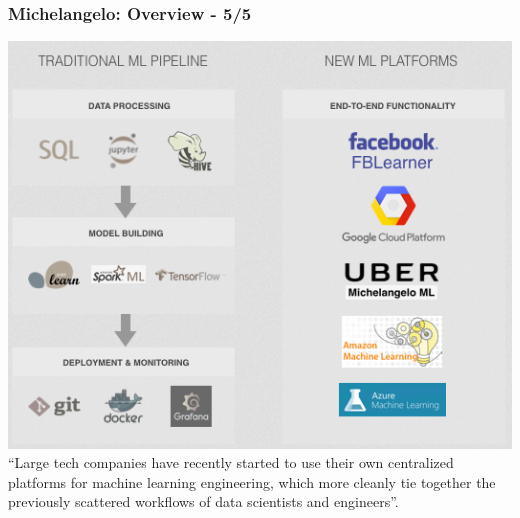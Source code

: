 \documentclass[hyperref={pdfpagelabels=false}]{beamer}
\begin{document}
        \begin{frame}
          \frametitle{Michelangelo: Overview - 5/5}
          \begin{center}
            \includegraphics[scale=0.43]{evolution_ml_engineering.png}
            \scriptsize{\\``Large tech companies have recently started to use their own centralized platforms for machine learning engineering, which more cleanly tie together the previously scattered workflows of data scientists and engineers''\cite{evolution-ml}.}
          \end{center}
        \end{frame}

           

     
\end{document}
